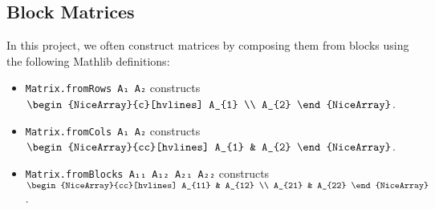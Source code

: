 \subsection{Block Matrices}

In this project, we often construct matrices by composing them from blocks using the following Mathlib definitions:
\begin{itemize}
    \item \texttt{Matrix.fromRows A₁ A₂} constructs
    $\begin{NiceArray}{c}[hvlines]
       A_{1} \\
       A_{2}
    \end{NiceArray}$.
    \item \texttt{Matrix.fromCols A₁ A₂} constructs
    $\begin{NiceArray}{cc}[hvlines]
       A_{1} & A_{2}
    \end{NiceArray}$.
    \item \texttt{Matrix.fromBlocks A₁₁ A₁₂ A₂₁ A₂₂} constructs\newline
    $\begin{NiceArray}{cc}[hvlines]
       A_{11} & A_{12} \\
       A_{21} & A_{22}
    \end{NiceArray}$.
\end{itemize}
